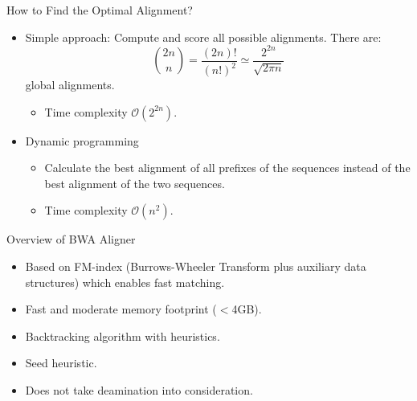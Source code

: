 \documentclass{beamer}
\begin{document}

\begin{frame}{ How to Find the Optimal Alignment? }

\begin{itemize}
	\item Simple approach: Compute and score all possible
	alignments.
	\vskip 0.35cm
	There are:
		$$ \binom{2n}{n} = \frac{(2n)!}{(n!)^2} \simeq \frac{2^{2n}}{\sqrt{2\pi n}} $$
		\vskip 0.2cm
		global alignments.
	\begin{itemize}	 
		\item Time complexity $\mathcal{O}(2^{2n})$.
	\end{itemize}	
	\vskip 0.25cm		
	\item Dynamic programming
		\begin{itemize}
			\item Calculate the best alignment of all prefixes of the sequences instead of the best alignment of the two sequences.
			\item  Time complexity $\mathcal{O}(n^{2})$.
		\end{itemize}
\end{itemize}

\end{frame}


\begin{frame}{ Overview of BWA Aligner}
	\begin{itemize}
		\item Based on FM-index (Burrows-Wheeler Transform plus auxiliary data structures)
		which enables fast matching. 
     	\item Fast and moderate memory footprint ($<$4GB).
		\item Backtracking algorithm with heuristics.
		\item Seed heuristic.
		\item Does not take deamination into consideration.
	\end{itemize}
\end{frame}
\end{document}
